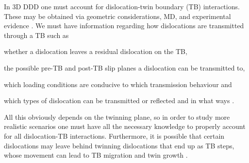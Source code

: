 In 3D DDD one must account for dislocation-twin boundary (TB) interactions. These may be obtained via geometric considerations, MD, and experimental evidence \cite{twinning2,twinning3,twinning4,twinning5}. We must have information regarding how dislocations are transmitted through a TB such as
\begin{inparaenum}[\itshape 1\upshape)]
    \item whether a dislocation leaves a residual dislocation on the TB,
    \item the possible pre-TB and post-TB slip planes a dislocation can be transmitted to,
    \item which loading conditions are conducive to which transmission behaviour and
    \item which types of dislocation can be transmitted or reflected and in what ways \cite{twinning}.
\end{inparaenum}
All this obviously depends on the twinning plane, so in order to study more realistic scenarios one must have all the necessary knowledge to properly account for all dislocation-TB interactions. Furthermore, it is possible that certain dislocations may leave behind twinning dislocations that end up as TB steps, whose movement can lead to TB migration and twin growth \cite{twinning6, twinning7}.

